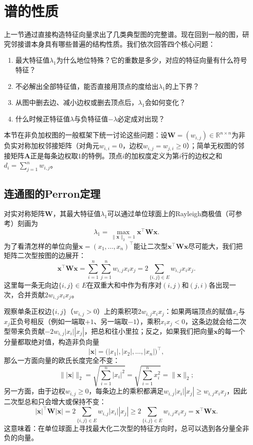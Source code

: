 \section{谱的性质}
\label{sec:adjacency-spectral-properties}

上一节通过直接构造特征向量求出了几类典型图的完整谱。现在回到一般的图，研究邻接谱本身具有哪些普遍的结构性质。我们依次回答四个核心问题：
\begin{enumerate}
\item 最大特征值$\lambda_1$为什么地位特殊？它的重数是多少，对应的特征向量有什么符号特征？
\item 不必解出全部特征值，能否直接用顶点的度给出$\lambda_1$的上下界？
\item 从图中删去边、减小边权或删去顶点后，$\lambda_1$会如何变化？
\item 什么时候正特征值$\lambda$与负特征值$-\lambda$必定成对出现？
\end{enumerate}

本节在非负加权图的一般框架下统一讨论这些问题：设$\bm W=(w_{i,j})\in\mathbb R^{n\times n}$为非负实对称加权邻接矩阵（对角元$w_{i,i}=0$，边权$w_{i,j}=w_{j,i}\geq 0$）；简单无权图的邻接矩阵$\bm A$正是每条边权取$1$的特例。顶点$i$的加权度定义为第$i$行的边权之和$d_i=\sum_{j=1}^n w_{i,j}$。

\subsection{连通图的Perron定理}
\label{sec:adjacency-perron-theorem}

对实对称矩阵$\bm W$，其最大特征值$\lambda_1$可以通过单位球面上的Rayleigh商极值（可参考）刻画为
\[
\lambda_1=\max_{\|\bm x\|_2=1}\bm x^\top\bm W\bm x.
\]
为了看清怎样的单位向量$\bm x=(x_1,\ldots,x_n)^\top$能让二次型$\bm x^\top\bm W\bm x$尽可能大，我们把矩阵二次型按图的边展开：
\[
\bm x^\top\bm W\bm x
=\sum_{i=1}^n\sum_{j=1}^n w_{i,j}x_i x_j
=2\sum_{\{i,j\}\in E}w_{i,j}x_i x_j.
\]
这里每一条无向边$\{i,j\}\in E$在双重大和中作为有序对$(i,j)$和$(j,i)$各出现一次，合并贡献$2w_{i,j}x_i x_j$。

观察单条正权边$\{i,j\}$（$w_{i,j}>0$）上的乘积项$2w_{i,j}x_i x_j$：如果两端顶点的赋值$x_i$与$x_j$正负号相反（例如一端取$+1$、另一端取$-1$），乘积$x_i x_j<0$，这条边就会给二次型带来负贡献$-2w_{i,j}|x_i||x_j|$，把总和往小里拉；反之，如果我们把向量$\bm x$的每一个分量都取绝对值，构造非负向量
\[
|\bm x|=\bigl(|x_1|,|x_2|,\ldots,|x_n|\bigr)^\top,
\]
那么一方面向量的欧氏长度完全不变：
\[
\bigl\||\bm x|\bigr\|_2=\sqrt{\sum_{i=1}^n |x_i|^2}=\sqrt{\sum_{i=1}^n x_i^2}=\|\bm x\|_2;
\]
另一方面，由于边权$w_{i,j}\geq 0$，每条边上的乘积都满足$w_{i,j}|x_i||x_j|\geq w_{i,j}x_i x_j$，因此二次型总和只会增大或保持不变：
\[
|\bm x|^\top\bm W|\bm x|
=2\sum_{\{i,j\}\in E}w_{i,j}|x_i||x_j|
\geq 2\sum_{\{i,j\}\in E}w_{i,j}x_i x_j
=\bm x^\top\bm W\bm x.
\]
这意味着：在单位球面上寻找最大化二次型的特征方向时，总可以选到各分量全非负的向量。

